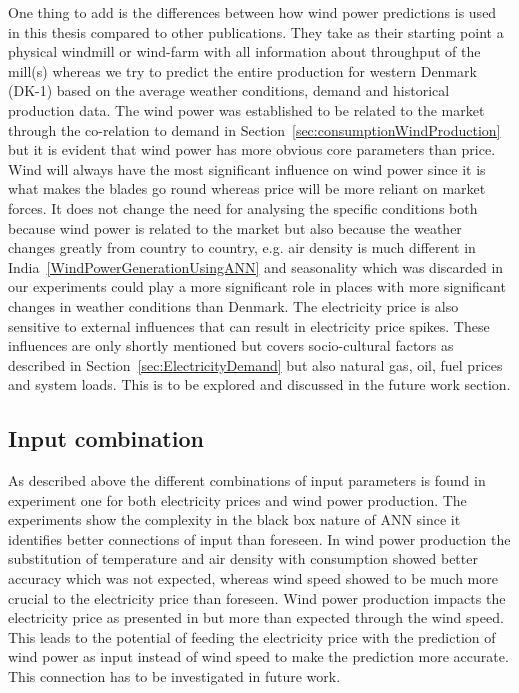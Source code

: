 One thing to add is the differences between how wind power predictions is used in this thesis compared to other publications. They take as their starting point a physical windmill or wind-farm with all information about throughput of the mill(s)\cite{windForecastPortugal,ShortTermWindPowerForecasting,dayAheadImpactOfWindPowerForecasts,WindPowerGenerationUsingANN} whereas we try to predict the entire production for western Denmark (DK-1) based on the average weather conditions, demand and historical production data. The wind power was established to be related to the market through the co-relation to demand in Section~\ref{sec:consumptionWindProduction} but it is evident that wind power has more obvious core parameters than price. Wind will always have the most significant influence on wind power since it is what makes the blades go round whereas price will be more reliant on market forces. It does not change the need for analysing the specific conditions both because wind power is related to the market but also because the weather changes greatly from country to country, e.g. air density is much different in India~\ref{WindPowerGenerationUsingANN} and seasonality which was discarded in our experiments could play a more significant role in places with more significant changes in weather conditions than Denmark. The electricity price is also sensitive to external influences that can result in electricity price spikes\cite{singhal2011electricity}. These influences are only shortly mentioned but covers socio-cultural factors as described in Section~\ref{sec:ElectricityDemand} but also natural gas, oil, fuel prices and system loads\cite{singhal2011electricity}. This is to be explored and discussed in the future work section.  

\subsection{Input combination}
As described above the different combinations of input parameters is found in experiment one for both electricity prices and wind power production. The experiments show the complexity in the black box nature of ANN since it identifies better connections of input than foreseen. In wind power production the substitution of temperature and air density with consumption showed better accuracy which was not expected, whereas wind speed showed to be much more crucial to the electricity price than foreseen. Wind power production impacts the electricity price as presented in \cite{dayAheadImpactOfWindPowerForecasts} but more than expected through the wind speed. This leads to the potential of feeding the electricity price with the prediction of wind power as input instead of wind speed to make the prediction more accurate. This connection has to be investigated in future work.


